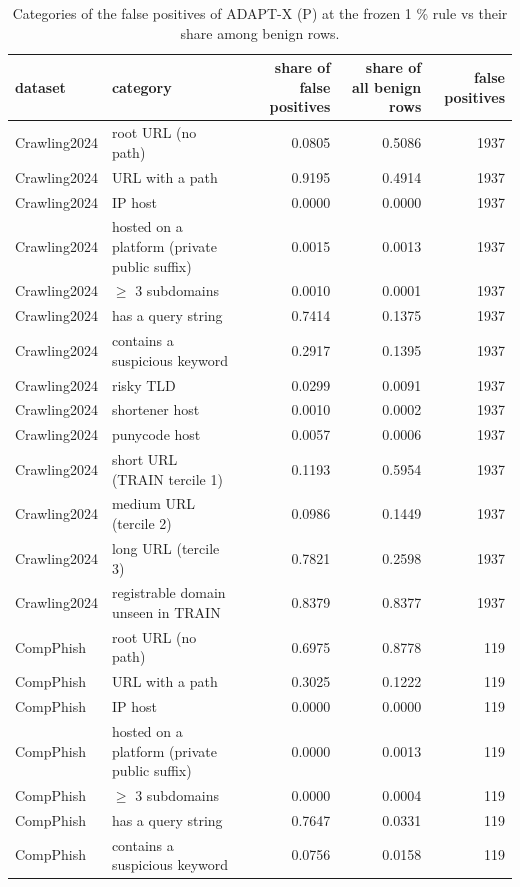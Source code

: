 \begin{table}[t]
\centering
\scriptsize
\caption{Categories of the false positives of ADAPT-X (P) at the frozen 1 \% rule vs their share among benign rows.}
\label{tab:rev_R7_false_positive_categories}
\begin{tabular}{llrrr}
\toprule
dataset & category & share of false positives & share of all benign rows & false positives \\
\midrule
Crawling2024 & root URL (no path) & 0.0805 & 0.5086 & 1937 \\
Crawling2024 & URL with a path & 0.9195 & 0.4914 & 1937 \\
Crawling2024 & IP host & 0.0000 & 0.0000 & 1937 \\
Crawling2024 & hosted on a platform (private public suffix) & 0.0015 & 0.0013 & 1937 \\
Crawling2024 & $\geq$ 3 subdomains & 0.0010 & 0.0001 & 1937 \\
Crawling2024 & has a query string & 0.7414 & 0.1375 & 1937 \\
Crawling2024 & contains a suspicious keyword & 0.2917 & 0.1395 & 1937 \\
Crawling2024 & risky TLD & 0.0299 & 0.0091 & 1937 \\
Crawling2024 & shortener host & 0.0010 & 0.0002 & 1937 \\
Crawling2024 & punycode host & 0.0057 & 0.0006 & 1937 \\
Crawling2024 & short URL (TRAIN tercile 1) & 0.1193 & 0.5954 & 1937 \\
Crawling2024 & medium URL (tercile 2) & 0.0986 & 0.1449 & 1937 \\
Crawling2024 & long URL (tercile 3) & 0.7821 & 0.2598 & 1937 \\
Crawling2024 & registrable domain unseen in TRAIN & 0.8379 & 0.8377 & 1937 \\
CompPhish & root URL (no path) & 0.6975 & 0.8778 & 119 \\
CompPhish & URL with a path & 0.3025 & 0.1222 & 119 \\
CompPhish & IP host & 0.0000 & 0.0000 & 119 \\
CompPhish & hosted on a platform (private public suffix) & 0.0000 & 0.0013 & 119 \\
CompPhish & $\geq$ 3 subdomains & 0.0000 & 0.0004 & 119 \\
CompPhish & has a query string & 0.7647 & 0.0331 & 119 \\
CompPhish & contains a suspicious keyword & 0.0756 & 0.0158 & 119 \\

\end{tabular}
\end{table}

